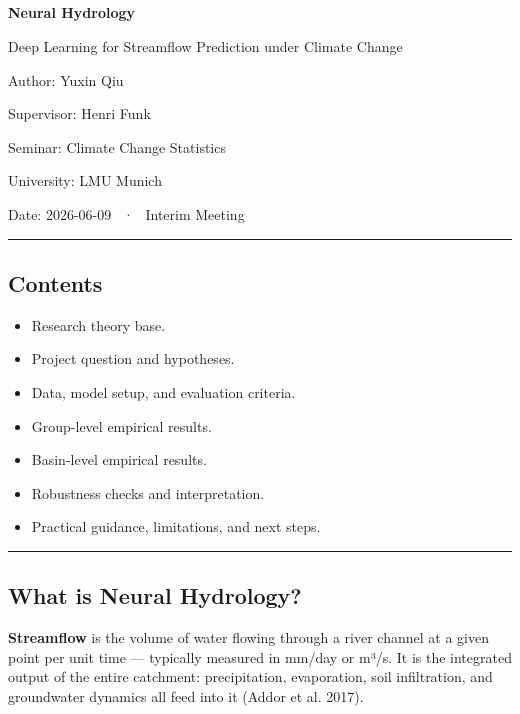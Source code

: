 \documentclass[
  letterpaper,
  DIV=11,
  numbers=noendperiod]{scrartcl}
\author{}
\date{}
\providecommand{\tightlist}{%
  \setlength{\itemsep}{0pt}\setlength{\parskip}{0pt}}
\begin{document}
\subsection{}\label{section}

\textbf{Neural Hydrology}

Deep Learning for Streamflow Prediction under Climate Change

Author: Yuxin Qiu

Supervisor: Henri Funk

Seminar: Climate Change Statistics

University: LMU Munich

Date: 2026-06-09  ·  Interim Meeting

\begin{center}\rule{0.5\linewidth}{0.5pt}\end{center}

\subsection{Contents}\label{contents}

\begin{itemize}
\tightlist
\item
  Research theory base.
\item
  Project question and hypotheses.
\item
  Data, model setup, and evaluation criteria.
\item
  Group-level empirical results.
\item
  Basin-level empirical results.
\item
  Robustness checks and interpretation.
\item
  Practical guidance, limitations, and next steps.
\end{itemize}

\begin{center}\rule{0.5\linewidth}{0.5pt}\end{center}

\subsection{What is Neural Hydrology?}\label{what-is-neural-hydrology}

\textbf{Streamflow} is the volume of water flowing through a river
channel at a given point per unit time --- typically measured in mm/day
or m³/s. It is the integrated output of the entire catchment:
precipitation, evaporation, soil infiltration, and groundwater dynamics
all feed into it (Addor et al. 2017).
\end{document}
